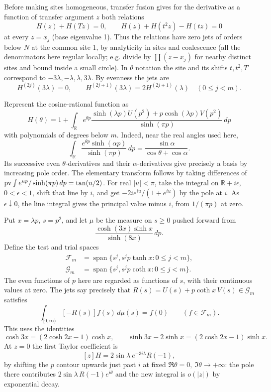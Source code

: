 Before making sites homogeneous, transfer fusion gives for the derivative as a function of transfer argument \(z\) both relations
\[
 H(z)+H(Tz)=0,\qquad H(z)+H(t^2z)-H(tz)=0
\]
at every \(z=x_j\) (base eigenvalue 1). Thus the relations have zero jets of orders below \(N\) at the common site 1, by analyticity in sites and coalescence (all the denominators here regular locally; e.g. divide by \(\prod(z-x_j)\) for nearby distinct sites and bound inside a small circle). In \(\theta\) notation the site and its shifts \(t,t^2,T\) correspond to \(-3\lambda,-\lambda,\lambda,3\lambda\). By evenness the jets are
\[
 H^{(2j)}(3\lambda)=0,\qquad
 H^{(2j+1)}(3\lambda)=2H^{(2j+1)}(\lambda)\quad(0\le j<m).
\]

Represent the cosine-rational function as
\[
 H(\theta)=1+\int_{\mathbb R} e^{\theta p}
 \frac{\sinh(\lambda p)U(p^2)+p\cosh(\lambda p)V(p^2)}{\sinh(\pi p)}\,dp
\]
with polynomials of degrees below \(m\). Indeed, near the real angles used here,
\[
 \int_{\mathbb R}\frac{e^{\theta p}\sinh(\alpha p)}{\sinh(\pi p)}\,dp
 =\frac{\sin\alpha}{\cos\theta+\cos\alpha}.
\]
Its successive even \(\theta\)-derivatives and their \(\alpha\)-derivatives give precisely a basis by increasing pole order. The elementary transform follows by taking differences of \({\rm pv}\int e^{u p}/\sinh(\pi p)\,dp=\tan(u/2)\). For real \(|u|<\pi\), take the integral on \(\mathbb R+i\epsilon\), \(0<\epsilon<1\), shift that line by \(i\), and get \(-2i e^{iu}/(1+e^{iu})\) by the pole at \(i\). As \(\epsilon\downarrow0\), the line integral gives the principal value minus \(i\), from \(1/(\pi p)\) at zero.

Put \(x=\lambda p\), \(s=p^2\), and let \(\mu\) be the measure on \(s\ge0\) pushed forward from
\[
 \frac{\cosh(3x)\sinh x}{\sinh(8x)}\,dp.
\]
Define the test and trial spaces
\[
 \begin{aligned}
 \mathcal F_m&=\operatorname{span}\{s^j,s^j p\tanh x:0\le j<m\},\\
 \mathcal G_m&=\operatorname{span}\{s^j,s^j p\coth x:0\le j<m\}.
 \end{aligned}
\]
The even functions of \(p\) here are regarded as functions of \(s\), with their continuous values at zero. The jets say precisely that \(R(s)=U(s)+p\coth x\,V(s)\in\mathcal G_m\) satisfies
\begin{equation}\label{eq:pv:boundary-representer}
 \int_{[0,\infty)}[-R(s)]f(s)\,d\mu(s)=f(0)
 \qquad(f\in\mathcal F_m).
\end{equation}
This uses the identities
\[
 \cosh3x=(2\cosh2x-1)\cosh x,\qquad
 \sinh3x-2\sinh x=(2\cosh2x-1)\sinh x.
\]
At \(z=0\) the first Taylor coefficient is
\begin{equation}\label{eq:pv:boundary-coefficient}
 [z]H=2\sin\lambda\ e^{-3i\lambda}R(-1),
\end{equation}
by shifting the \(p\) contour upwards just past \(i\) at fixed \(\Re\theta=0,\ \Im\theta\to+\infty\): the pole there contributes \(2\sin\lambda\,R(-1)e^{i\theta}\) and the new integral is \(o(|z|)\) by exponential decay.

